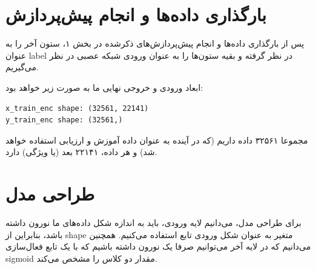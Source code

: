 \documentclass{article}
\begin{document}
\let\oldsection\section
\renewcommand\section{\clearpage\oldsection}





\section{
بارگذاری داده‌ها و انجام پیش‌پردازش
}


پس از بارگذاری داده‌ها و انجام پیش‌پردازش‌های ذکرشده در بخش ۱، ستون آخر را به عنوان label در نظر گرفته و بقیه ستون‌ها را به عنوان ورودی شبکه عصبی در نظر می‌گیریم.

ابعاد ورودی و خروجی نهایی ما به صورت زیر خواهد بود:


\begin{latin}
\begin{lstlisting}
x_train_enc shape: (32561, 22141)
y_train_enc shape: (32561,)
\end{lstlisting}
\end{latin}

مجموعا ۳۲۵۶۱ داده داریم (که در آینده به عنوان داده آموزش و ارزیابی استفاده خواهد شد) و هر داده، ۲۲۱۴۱ بعد (یا ویژگی) دارد.




\section{
طراحی مدل
}

برای طراحی مدل، می‌دانیم لایه ورودی، باید به اندازه شکل داده‌های ما نورون داشته باشد، بنابراین از shape متغیر  به عنوان شکل ورودی تابع استفاده می‌کنیم. همچنین می‌دانیم که در لایه آخر می‌توانیم صرفا یک نورون داشته باشیم که با یک تابع فعال‌سازی sigmoid مقدار دو کلاس را مشخص می‌کند.




\medskip

\small
\LTR 
\latin
\end{document}
